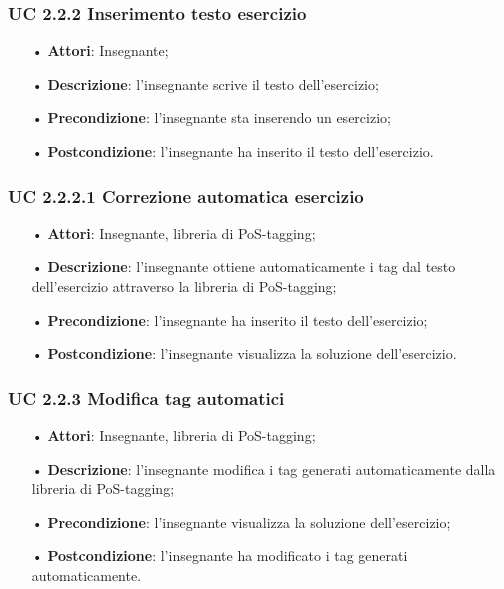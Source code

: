 \subsubsection{UC 2.2.2 Inserimento testo esercizio}

\begin{itemize}
	\item[•] \textbf{Attori}: Insegnante;
	\item[•] \textbf{Descrizione}: l'insegnante scrive il testo dell'esercizio;
	\item[•] \textbf{Precondizione}: l'insegnante sta inserendo un esercizio;
	\item[•] \textbf{Postcondizione}: l'insegnante ha inserito il testo dell'esercizio.
\end{itemize}

 
\subsubsection{UC 2.2.2.1 Correzione automatica esercizio}
\begin{itemize}
	\item[•] \textbf{Attori}: Insegnante, libreria di PoS-tagging;
	\item[•] \textbf{Descrizione}: l’insegnante ottiene automaticamente i tag dal testo dell'esercizio attraverso la libreria di PoS-tagging;
	\item[•] \textbf{Precondizione}: l'insegnante ha inserito il testo dell'esercizio;
	\item[•] \textbf{Postcondizione}: l'insegnante visualizza la soluzione dell'esercizio.
\end{itemize}


\subsubsection{UC 2.2.3 Modifica tag automatici}
\begin{itemize}
	\item[•] \textbf{Attori}: Insegnante, libreria di PoS-tagging;
	\item[•] \textbf{Descrizione}: l’insegnante modifica i tag generati automaticamente dalla libreria di PoS-tagging;
	\item[•] \textbf{Precondizione}: l'insegnante visualizza la soluzione dell'esercizio;
	\item[•] \textbf{Postcondizione}: l'insegnante ha modificato i tag generati automaticamente.
\end{itemize}



